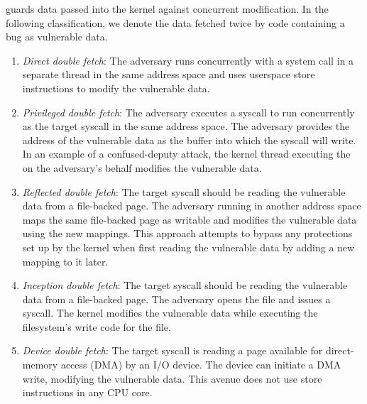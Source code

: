 \documentclass[letterpaper,twocolumn,10pt, anonymous]{article}
\begin{document}
\tiktok guards data passed into the kernel against concurrent modification.
In the following classification, we denote the data fetched twice
by code containing a \tocttou bug as vulnerable data.
\begin{enumerate}
  \item \label{attk:direct} \emph{Direct double fetch}: The adversary runs
  concurrently with a system call in a separate thread in the same address space
  and uses userspace store instructions to modify the vulnerable data.

  \item \label{attk:systemcall} \emph{Privileged double fetch}: The adversary
  executes a  syscall to run concurrently as the target syscall in 
  the same address space. 
  The adversary provides the address of the vulnerable data as the buffer 
  into which the  syscall will write.
  In an example of a confused-deputy attack, the kernel thread executing the
   on the adversary's behalf modifies the vulnerable data.

  \item \label{attk:remapping} \emph{Reflected double fetch}: The target
  syscall should be reading the vulnerable data from a file-backed page.
  The adversary running in another address space maps the same file-backed page
  as writable and modifies the vulnerable data using the new mappings.
  This approach attempts to bypass any protections set up by the kernel
  when first reading the vulnerable data by adding a new mapping to it later.

  \item \label{attk:writebuffers} \emph{Inception double fetch}: The 
  target syscall should be reading the vulnerable data from a file-backed 
  page. The adversary opens the file and issues a  syscall.
  The kernel modifies the vulnerable data while executing the filesystem's
  write code for the file.

  \item \label{attk:devicefiles} \emph{Device double fetch}: The target 
  syscall is reading a page available for direct-memory access (DMA) by 
  an I/O device. The device can initiate a DMA write, modifying the 
  vulnerable data. This avenue does not use store instructions in any 
  CPU core.

\end{enumerate}
\end{document}
